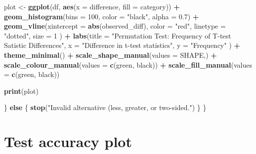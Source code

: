 \documentclass[
]{book}
\newenvironment{Shaded}{\begin{snugshade}}{\end{snugshade}}
\newcommand{\AttributeTok}[1]{\textcolor[rgb]{0.13,0.29,0.53}{#1}}
\newcommand{\ControlFlowTok}[1]{\textcolor[rgb]{0.13,0.29,0.53}{\textbf{#1}}}
\newcommand{\DecValTok}[1]{\textcolor[rgb]{0.00,0.00,0.81}{#1}}
\newcommand{\FloatTok}[1]{\textcolor[rgb]{0.00,0.00,0.81}{#1}}
\newcommand{\FunctionTok}[1]{\textcolor[rgb]{0.13,0.29,0.53}{\textbf{#1}}}
\newcommand{\NormalTok}[1]{#1}
\newcommand{\OtherTok}[1]{\textcolor[rgb]{0.56,0.35,0.01}{#1}}
\newcommand{\SpecialCharTok}[1]{\textcolor[rgb]{0.81,0.36,0.00}{\textbf{#1}}}
\newcommand{\StringTok}[1]{\textcolor[rgb]{0.31,0.60,0.02}{#1}}
\begin{document}
\begin{Shaded}
\begin{Highlighting}[]
\NormalTok{    plot }\OtherTok{\textless{}{-}} \FunctionTok{ggplot}\NormalTok{(df, }\FunctionTok{aes}\NormalTok{(}\AttributeTok{x =}\NormalTok{ difference, }\AttributeTok{fill =}\NormalTok{ category)) }\SpecialCharTok{+}
        \FunctionTok{geom\_histogram}\NormalTok{(}\AttributeTok{bins =} \DecValTok{100}\NormalTok{,}
                        \AttributeTok{color =} \StringTok{"black"}\NormalTok{,}
                        \AttributeTok{alpha =} \FloatTok{0.7}\NormalTok{) }\SpecialCharTok{+}
        \FunctionTok{geom\_vline}\NormalTok{(}\AttributeTok{xintercept =} \FunctionTok{abs}\NormalTok{(observed\_diff),}
                    \AttributeTok{color =} \StringTok{"red"}\NormalTok{,}
                    \AttributeTok{linetype =} \StringTok{"dotted"}\NormalTok{,}
                    \AttributeTok{size =} \DecValTok{1}
\NormalTok{                    ) }\SpecialCharTok{+}
        \FunctionTok{labs}\NormalTok{(}\AttributeTok{title =} \StringTok{"Permutation Test: Frequency of T{-}test Satistic Differences"}\NormalTok{,}
                \AttributeTok{x =} \StringTok{"Difference in t{-}test statistics"}\NormalTok{,}
                \AttributeTok{y =} \StringTok{"Frequency"}
\NormalTok{                ) }\SpecialCharTok{+}
        \FunctionTok{theme\_minimal}\NormalTok{() }\SpecialCharTok{+}
        \FunctionTok{scale\_shape\_manual}\NormalTok{(}\AttributeTok{values =}\NormalTok{ SHAPE,) }\SpecialCharTok{+}
        \FunctionTok{scale\_colour\_manual}\NormalTok{(}\AttributeTok{values =} \FunctionTok{c}\NormalTok{(}\StringTok{\textquotesingle{}green\textquotesingle{}}\NormalTok{, }\StringTok{\textquotesingle{}black\textquotesingle{}}\NormalTok{)) }\SpecialCharTok{+}
        \FunctionTok{scale\_fill\_manual}\NormalTok{(}\AttributeTok{values =} \FunctionTok{c}\NormalTok{(}\StringTok{\textquotesingle{}green\textquotesingle{}}\NormalTok{, }\StringTok{\textquotesingle{}black\textquotesingle{}}\NormalTok{))}

  \FunctionTok{print}\NormalTok{(plot)}

\NormalTok{  \} }\ControlFlowTok{else}\NormalTok{ \{}
    \FunctionTok{stop}\NormalTok{(}\StringTok{"Invalid alternative (less, greater, or two{-}sided."}\NormalTok{)}
\NormalTok{  \}}
\NormalTok{\}}
\end{Highlighting}
\end{Shaded}

\hypertarget{test-accuracy-plot}{%
\section{Test accuracy plot}\label{test-accuracy-plot}}
\end{document}
